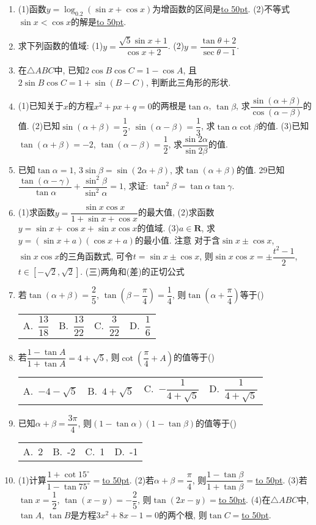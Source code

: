 \documentclass[10pt,a4paper]{article}
\newcommand{\blank}[1]{\underline{\hbox to #1pt{}}}
\newcommand{\fourch}[4]{\par\begin{tabular}{p{.23\textwidth}p{.23\textwidth}p{.23\textwidth}p{.23\textwidth}}
A.~#1 &B.~#2& C.~#3& D.~#4
\end{tabular}}
\begin{document}
\begin{enumerate}[1.]
(2)计算: $\dfrac{\sin 7^\circ +\sin 8^\circ \cos 15^\circ }{\cos 7^\circ -\sin 8^\circ \sin 15^\circ }=$\blank{50}.
(3)计算: $\csc 10^\circ -\sqrt 3\sec 10^\circ =$\blank{50}.
\item (1)函数$y=\log _{0.2}(\sin x+\cos x)$为增函数的区间是\blank{50}.
(2)不等式$\sin x<\cos x$的解是\blank{50}.
\item 求下列函数的值域:
(1)$y=\dfrac{\sqrt 5\sin x+1}{\cos x+2}$.					(2)$y=\dfrac{\tan \theta +2}{\sec \theta -1}$.
\item 在$\triangle ABC$中, 已知$2\cos B\cos C=1-\cos A$, 且$2\sin B\cos C=1+\sin (B-C)$, 判断此三角形的形状.
\item (1)已知关于$x$的方程$x^2+px+q=0$的两根是$\tan \alpha$, $\tan \beta$, 求$\dfrac{\sin (\alpha +\beta)}{\cos (\alpha -\beta)}$的值.
(2)已知$\sin (\alpha +\beta)=\dfrac 12$, $\sin (\alpha -\beta)=\dfrac 13$, 求$\tan \alpha \cot \beta$的值.
(3)已知$\tan (\alpha +\beta)=-2$, $\tan (\alpha -\beta)=\dfrac 12$, 求$\dfrac{\sin 2\alpha }{\sin 2\beta }$的值.
\item 已知$\tan \alpha =1$, $3\sin \beta =\sin (2\alpha +\beta)$, 求$\tan (\alpha +\beta)$的值.
29已知$\dfrac{\tan (\alpha -\gamma)}{\tan \alpha }+\dfrac{\sin ^2\beta }{\sin ^2\alpha }=1$, 求证: $\tan ^2\beta =\tan \alpha \tan \gamma$.
\item (1)求函数$y=\dfrac{\sin x\cos x}{1+\sin x+\cos x}$的最大值,
(2)求函数$y=\sin x+\cos x+\sin x\cos x$的值域.
(3)$a\in \mathbf{R}$, 求$y=(\sin x+a)(\cos x+a)$的最小值.
注意  对于含$\sin x\pm \cos x$, $\sin x\cos x$的三角函数式, 可令$t=\sin x\pm \cos x$, 则$\sin x\cos x=\pm \dfrac{t^2-1}2$, $t\in [-\sqrt 2,\sqrt 2]$.
(三)两角和(差)的正切公式
\item 若$\tan (\alpha +\beta)=\dfrac 25$, $\tan (\beta -\dfrac{\pi }4)=\dfrac 14$, 则$\tan (\alpha +\dfrac{\pi }4)$等于()
\fourch{$\dfrac{13}{18}$}{$\dfrac{13}{22}$}{$\dfrac 3{22}$}{$\dfrac 16$}
\item 若$\dfrac{1-\tan A}{1+\tan A}=4+\sqrt 5$, 则$\cot (\dfrac{\pi }4+A)$的值等于()
\fourch{$-4-\sqrt 5$}{$4+\sqrt 5$}{$-\dfrac 1{4+\sqrt 5}$}{$\dfrac 1{4+\sqrt 5}$}
\item 已知$\alpha +\beta =\dfrac{3\pi }4$, 则$(1-\tan \alpha)(1-\tan \beta)$的值等于()
\fourch{2}{-2}{1}{-1}
\item (1)计算$\dfrac{1+\cot 15^\circ }{1-\tan 75^\circ }=$\blank{50}.
(2)若$\alpha +\beta =\dfrac{\pi }4$, 则$\dfrac{1-\tan \beta }{1+\tan \beta }=$\blank{50}.
(3)若$\tan x=\dfrac 12$, $\tan (x-y)=-\dfrac 25$, 则$\tan (2x-y)=$\blank{50}.
(4)在$\triangle ABC$中, $\tan A$, $\tan B$是方程$3x^2+8x-1=0$的两个根, 则$\tan C=$\blank{50}.

\end{enumerate}
\end{document}
